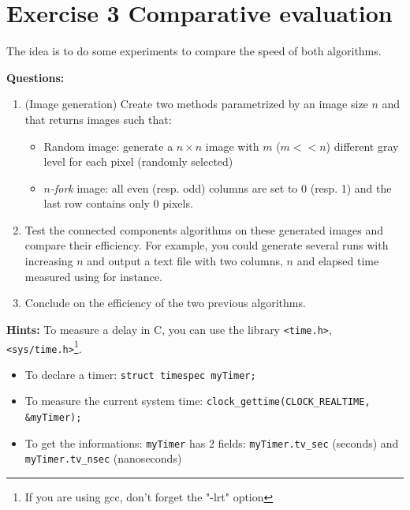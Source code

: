 \documentclass[a4paper, 11pt, french]{article}
\begin{document}
\section*{Exercise 3 \rm Comparative evaluation}

\par The idea is to do some experiments to compare the speed of both algorithms.

{\bf Questions:}
\begin{enumerate}
	\item (Image generation) Create two methods parametrized by an image size $n$ and that returns images such that:
	\begin{itemize}
		\item Random image: generate a $n\times n$ image with $m$ ($m<<n$) different gray level for each pixel (randomly selected)
		\item \emph{$n$-fork} image: all even (resp. odd) columns are set to 0 (resp. 1) and the last row contains only 0 pixels. 
	\end{itemize}
	
	\item Test the connected components algorithms on these generated images and compare their efficiency. For example, you could generate several runs with increasing $n$ and output a text file with two columns, $n$ and elapsed time measured using for instance.
	
	\item Conclude on the efficiency of the two previous algorithms.
\end{enumerate}

\smallskip
\par \textbf{Hints:} To measure a delay in C, you can use the library \texttt{<time.h>}, \texttt{<sys/time.h>}\footnote{If you are using gcc, don't forget the "-lrt" option}.
	\begin{itemize}
	\item To declare a timer: \texttt{struct timespec myTimer;}
	\item To measure the current system time: \texttt{clock\_gettime(CLOCK\_REALTIME, \&myTimer);}
	\item To get the informations: \texttt{myTimer} has 2 fields: \texttt{myTimer.tv\_sec} (seconds) and \texttt{myTimer.tv\_nsec} (nanoseconds)
	\end{itemize}
	
\end{document}
